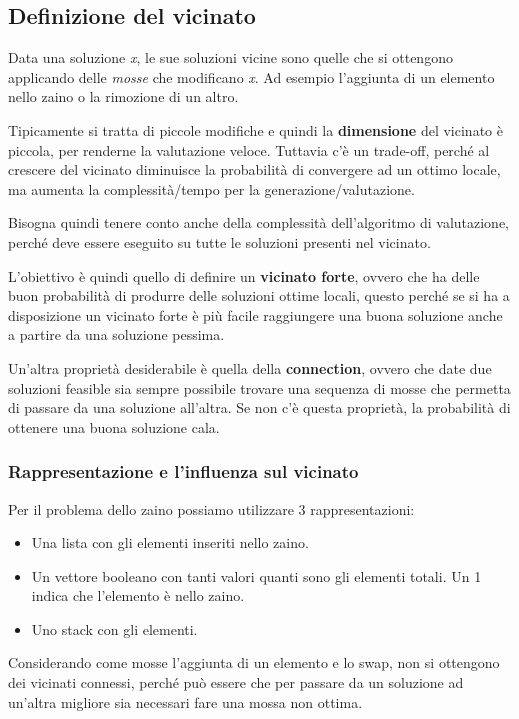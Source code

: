 \subsection{Definizione del vicinato}

Data una soluzione \textit{x}, le sue soluzioni vicine sono quelle che si ottengono applicando delle \textit{mosse} che modificano \textit{x}. Ad esempio l'aggiunta di un elemento nello zaino o la rimozione di un altro.

Tipicamente si tratta di piccole modifiche e quindi la \textbf{dimensione} del vicinato è piccola, per renderne la valutazione veloce. Tuttavia c'è un trade-off, perché al crescere del vicinato diminuisce la probabilità di convergere ad un ottimo locale, ma aumenta la complessità/tempo per la generazione/valutazione.

Bisogna quindi tenere conto anche della complessità dell'algoritmo di valutazione, perché deve essere eseguito su tutte le soluzioni presenti nel vicinato.

L'obiettivo è quindi quello di definire un \textbf{vicinato forte}, ovvero che ha delle buon probabilità di produrre delle soluzioni ottime locali, questo perché se si ha a disposizione un vicinato forte è più facile raggiungere una buona soluzione anche a partire da una soluzione pessima.

Un'altra proprietà desiderabile è quella della \textbf{connection}, ovvero che date due soluzioni feasible sia sempre possibile trovare una sequenza di mosse che permetta di passare da una soluzione all'altra. Se non c'è questa proprietà, la probabilità di ottenere una buona soluzione cala.

\subsubsection{Rappresentazione e l'influenza sul vicinato}

Per il problema dello zaino possiamo utilizzare 3 rappresentazioni:

\begin{itemize}
	\item Una lista con gli elementi inseriti nello zaino.
	\item Un vettore booleano con tanti valori quanti sono gli elementi totali. Un 1 indica che l'elemento è nello zaino.
	\item Uno stack con gli elementi.
\end{itemize}

Considerando come mosse l'aggiunta di un elemento e lo swap, non si ottengono dei vicinati connessi, perché può essere che per passare da un soluzione ad un'altra migliore sia necessari fare una mossa non ottima.

